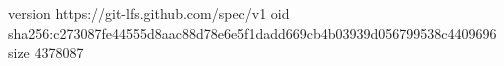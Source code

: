version https://git-lfs.github.com/spec/v1
oid sha256:c273087fe44555d8aac88d78e6e5f1dadd669cb4b03939d056799538c4409696
size 4378087
